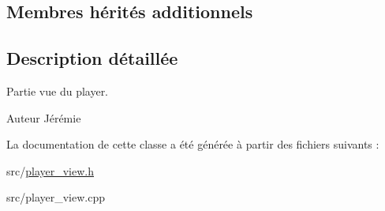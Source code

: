 \subsection*{Membres hérités additionnels}


\subsection{Description détaillée}
Partie vue du player. 

\begin{DoxyAuthor}{Auteur}
Jérémie 
\end{DoxyAuthor}


La documentation de cette classe a été générée à partir des fichiers suivants \+:\begin{DoxyCompactItemize}
\item 
src/\hyperlink{player__view_8h}{player\+\_\+view.\+h}\item 
src/player\+\_\+view.\+cpp\end{DoxyCompactItemize}
